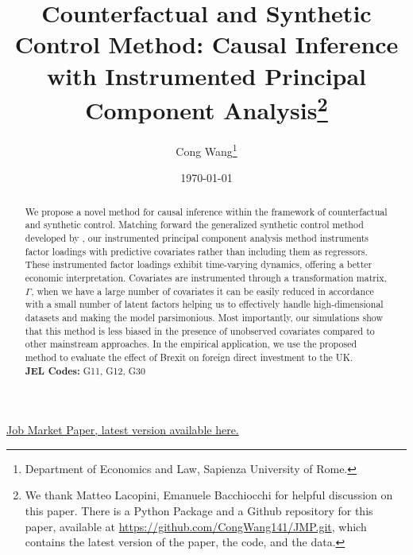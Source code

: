\documentclass[12pt]{article}
\begin{document}
\begin{titlepage}
\title{Counterfactual and Synthetic Control Method: Causal Inference with Instrumented Principal Component Analysis\thanks{We thank Matteo Lacopini, Emanuele Bacchiocchi for helpful discussion on this paper. There is a Python Package and a Github repository for this paper, available at \href{https://github.com/CongWang141/JMP.git}{https://github.com/CongWang141/JMP.git}, which contains the latest version of the paper, the code, and the data.}}

\author{Cong Wang\thanks{Department of Economics and Law, Sapienza University of Rome.}}
\date{\today}
\maketitle
\begin{center}
\href{https://github.com/CongWang141/JMP/blob/main/latex/main.pdf}{Job Market Paper, latest version available here.}
\end{center}

\begin{abstract}
\noindent We propose a novel method for causal inference within the framework of counterfactual and synthetic control. Matching forward the generalized synthetic control method developed by \cite{xu2017generalized}, our instrumented principal component analysis method instruments factor loadings with predictive covariates rather than including them as regressors. These instrumented factor loadings exhibit time-varying dynamics, offering a better economic interpretation. Covariates are instrumented through a transformation matrix, $\Gamma$, when we have a large number of covariates it can be easily reduced in accordance with a small number of latent factors helping us to effectively handle high-dimensional datasets and making the model parsimonious. Most importantly, our simulations show that this method is less biased in the presence of unobserved covariates compared to other mainstream approaches. In the empirical application, we use the proposed method to evaluate the effect of Brexit on foreign direct investment to the UK.\\

\noindent\textbf{JEL Codes:} G11, G12, G30\\
\bigskip
\end{abstract}
\setcounter{page}{0}
\thispagestyle{empty}
\end{titlepage}
\pagebreak \newpage
\doublespacing
\end{document}
